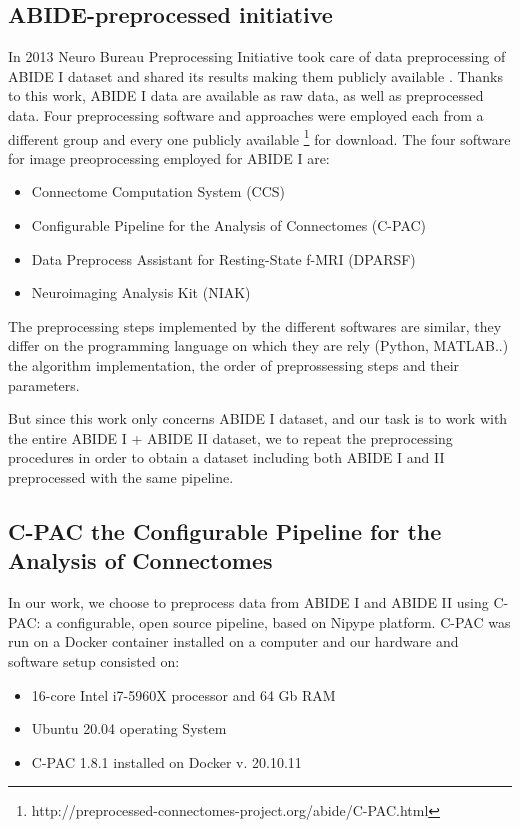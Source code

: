 \documentclass[10pt]{report}
\begin{document}
\subsection{ABIDE-preprocessed initiative}
In 2013 Neuro Bureau Preprocessing Initiative took care of data preprocessing of ABIDE I dataset and shared its results making them publicly available \cite{cameron2013}.
Thanks to this work, ABIDE I data are available as raw data, as well as preprocessed data.
Four preprocessing software and approaches were employed each from a different group and every one publicly available \footnote{http://preprocessed-connectomes-project.org/abide/C-PAC.html} for download.
The four software for image preoprocessing employed for ABIDE I are:
\begin{itemize}
\item Connectome Computation System (CCS)
\item Configurable Pipeline for the Analysis of Connectomes (C-PAC)
\item Data Preprocess Assistant for Resting-State f-MRI (DPARSF)
\item Neuroimaging Analysis Kit (NIAK)
\end{itemize}
The preprocessing steps implemented by the different softwares are similar, they differ on the programming language on which they are rely (Python, MATLAB..) the algorithm implementation, the order of preprossessing steps and their parameters.

But since this work only concerns ABIDE I dataset, and our task is to work with the entire ABIDE I + ABIDE II dataset, we to repeat the preprocessing procedures in order to obtain a dataset including both ABIDE I and II preprocessed with the same pipeline.

\subsection{C-PAC the Configurable Pipeline for the Analysis of Connectomes}

In our work, we choose to preprocess data from ABIDE I and ABIDE II using C-PAC: a configurable, open source pipeline, based on Nipype platform.
C-PAC was run on a Docker container installed on a computer and our hardware and software setup consisted on:
\begin{itemize}
\item 16-core Intel i7-5960X processor and 64 Gb RAM
\item Ubuntu 20.04 operating System
\item C-PAC 1.8.1 installed on Docker v. 20.10.11
\end{itemize}
\end{document}
